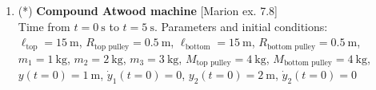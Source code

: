\documentclass[11pt, a4paper, twoside]{article}
\begin{document}
\begin{enumerate}
\item
\begin{minipage}[t][2cm]{0.65\textwidth}
(*) \textbf{Compound Atwood machine} [Marion ex. 7.8]\\
	Time from \(t = \SI{0}{\second}\) to \(t = \SI{5}{\second}\). Parameters and initial conditions:\\
\(\ell_\text{top} = \SI{15}{\metre}\), 
\(R_{\text{top pulley}} = \SI{0.5}{\metre}\), 
\(\ell_\text{bottom} = \SI{15}{\metre}\), 
\(R_{\text{bottom pulley}} = \SI{0.5}{\metre}\),\\ 
\(m_1 = \SI{1}{\kilo\gram}\),
\(m_2 = \SI{2}{\kilo\gram}\),
\(m_3 = \SI{3}{\kilo\gram}\),
\(M_{\text{top pulley}} = \SI{4}{\kilo\gram}\),
\(M_{\text{bottom pulley}} = \SI{4}{\kilo\gram}\),\\
\(y(t=0) = \SI{1}{\metre}\), \(\dot{y}_1(t=0) = 0\),
\(y_2(t=0) = \SI{2}{\metre}\), \(\dot{y}_2(t=0) = 0\)
\end{minipage}
\begin{minipage}[c][3cm][t]{0.3\textwidth}
		
\end{minipage}

\end{enumerate}
\end{document}
